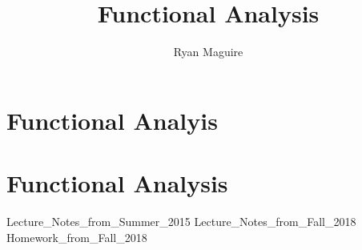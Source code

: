 \documentclass[crop=false,class=book,oneside]{standalone}
\begin{document}
    \newif\ifmathcoursesfunctional
    \ifx\ifmathcourses\undefined
        \title{Functional Analysis}
        \author{Ryan Maguire}
        \date{\vspace{-5ex}}
        \maketitle
        \tableofcontents
        \clearpage
        \chapter*{Functional Analyis}
        \setcounter{chapter}{1}
    \else
        \chapter{Functional Analysis}
    \fi
    {Lecture_Notes_from_Summer_2015}
    {Lecture_Notes_from_Fall_2018}
    {Homework_from_Fall_2018}
\end{document}
